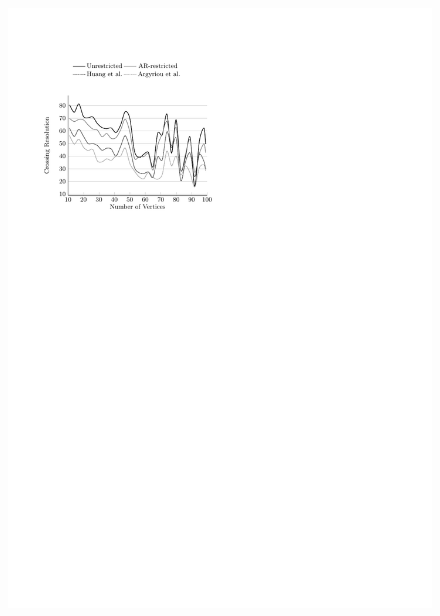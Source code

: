 \documentclass{comjnl}
\begin{document}
\begin{figure}[t!]
{	\includegraphics[scale=0.99,page=10]{figures/north}}
	

\end{figure}
\end{document}
